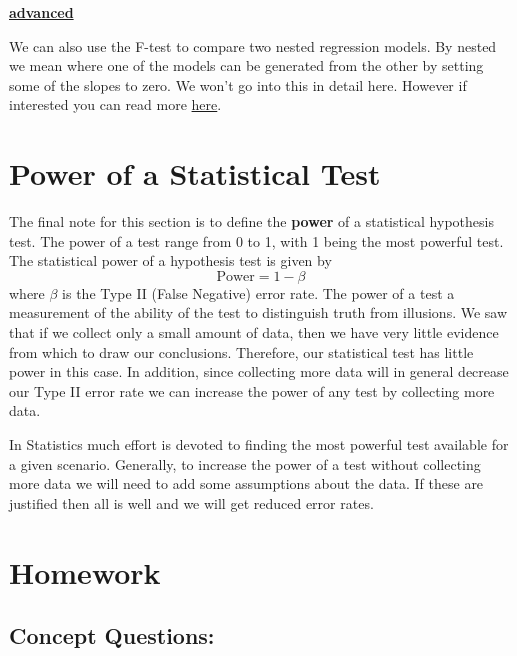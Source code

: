 \documentclass[
]{book}
\newenvironment{rmdblock}[1]
  {\begin{shaded*}
  \centerline{\underline{\textbf{#1}}}

  }
  {
  \end{shaded*}
  }
\newenvironment{advanced}
  {\begin{rmdblock}{advanced}}
  {\end{rmdblock}}
\theoremstyle{definition}
\theoremstyle{definition}
\theoremstyle{definition}
\theoremstyle{definition}
\theoremstyle{remark}
\begin{document}
\begin{advanced}
We can also use the F-test to compare two nested regression models. By nested we mean where one of the models can be generated from the other by setting some of the slopes to zero. We won't go into this in detail here. However if interested you can read more \href{https://bookdown.org/ndphillips/YaRrr/comparing-regression-models-with-anova.html}{here}.\\
\end{advanced}

\hypertarget{power-of-a-statistical-test}{%
\section{Power of a Statistical Test}\label{power-of-a-statistical-test}}

The final note for this section is to define the \textbf{power} of a statistical hypothesis test. The power of a test range from 0 to 1, with 1 being the most powerful test. The statistical power of a hypothesis test is given by \[\text{Power}=1-\beta\] where \(\beta\) is the Type II (False Negative) error rate. The power of a test a measurement of the ability of the test to distinguish truth from illusions. We saw that if we collect only a small amount of data, then we have very little evidence from which to draw our conclusions. Therefore, our statistical test has little power in this case. In addition, since collecting more data will in general decrease our Type II error rate we can increase the power of any test by collecting more data.

In Statistics much effort is devoted to finding the most powerful test available for a given scenario. Generally, to increase the power of a test without collecting more data we will need to add some assumptions about the data. If these are justified then all is well and we will get reduced error rates.

\hypertarget{homework-12}{%
\section{Homework}\label{homework-12}}

\hypertarget{concept-questions-11}{%
\subsection{Concept Questions:}\label{concept-questions-11}}
\end{document}
